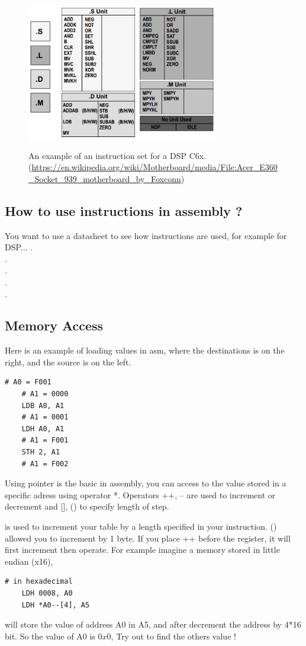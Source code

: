 \documentclass[runningheads,a4paper]{llncs}
\begin{document}
	\begin{figure}
		\centering
		\includegraphics[width=0.75\textwidth]{Figures/registerstable}
		\\ \parbox{0.75\textwidth}{\caption[registerTable]{An example of an instruction set for a DSP C6x. (\url{https://en.wikipedia.org/wiki/Motherboard/media/File:Acer_E360_Socket_939_motherboard_by_Foxconn}) }\label{fig:RegTable}} 
	\end{figure}
	
	\subsection{How to use instructions in assembly ?}
	
	You want to use a datasheet to see how instructions are used,
	for example for DSP...
	.\\.\\.\\.\\.\\
	
	\subsection{Memory Access}
	Here is an example of loading values in asm, where the destinations is on the right, and the source is on the left.
	\begin{lstlisting}[language={[x86masm]Assembler}]
	# A0 = F001
	# A1 = 0000
	LDB A0, A1
	# A1 = 0001
	LDH A0, A1
	# A1 = F001
	STH 2, A1
	# A1 = F002
	\end{lstlisting}
	
	Using pointer is the basic in assembly, you can access to the value stored in a specific adress using operator *. Operators ++, -- are used to increment or decrement and [], () to specify length of step.\par
	[] is used to increment your table by a length specified in your instruction. () allowed you to increment by 1 byte. If you place ++ before the register, it will first increment then operate. For example imagine a memory stored in little endian (x16),
	\begin{lstlisting}[language={[x86masm]Assembler}]
	# in hexadecimal
	LDH 0008, A0
	LDH *A0--[4], A5
	\end{lstlisting}
	will store the value of address A0 in A5, and after decrement the address by 4*16 bit. So the value of A0 is $0x0$,
	Try out to find the others value !
	
\end{document}
